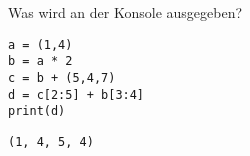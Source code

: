\question[2]
Was wird an der Konsole ausgegeben?
\begin{lstlisting}
a = (1,4)
b = a * 2
c = b + (5,4,7)
d = c[2:5] + b[3:4]
print(d)
\end{lstlisting}
\begin{solutionbox}{2cm}
\begin{lstlisting}
(1, 4, 5, 4)
\end{lstlisting}
\end{solutionbox}

